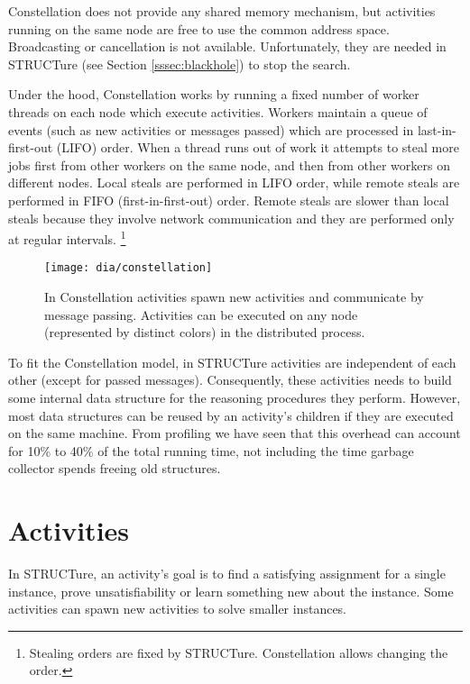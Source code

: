 Constellation does not provide any shared memory mechanism,
but activities running on the same node are free to use the
common address space. Broadcasting or cancellation is not
available. Unfortunately, they are needed in STRUCTure (see
Section \ref{sssec:blackhole}) to stop the search.

Under the hood, Constellation works by running a fixed number of
worker threads on each node which execute activities.  Workers
maintain a queue of events (such as new activities or messages
passed) which are processed in last-in-first-out (LIFO) order.
When a thread runs out of work it attempts to steal more jobs first
from other workers on the same node, and then from other workers
on different nodes.  Local steals are performed in LIFO order,
while remote steals are performed in FIFO (first-in-first-out)
order. Remote steals are slower than local steals because they
involve network communication and they are performed only at
regular intervals. \footnote{Stealing orders are fixed by STRUCTure.
Constellation allows changing the order.}

\begin{figure}
  \centering
  \texttt{[image: dia/constellation]}
  \caption{In Constellation activities spawn new
  activities and communicate by message passing.
  Activities can be executed on any node (represented by
  distinct colors) in the distributed process.}
  \label{fig:constellation}
\end{figure}


To fit the Constellation model, in STRUCTure activities are
independent of each other (except for passed messages). Consequently,
these activities needs to build some internal data structure for
the reasoning procedures they perform. However, most data structures
can be reused by an activity's children if they are executed on the
same machine. From profiling we have seen that this overhead can
account for 10\% to 40\% of the total running time, not including
the time garbage collector spends freeing old structures.

\section{Activities}

In STRUCTure, an activity's goal is to find a satisfying assignment
for a single instance, prove unsatisfiability or learn something new
about the instance. Some activities can spawn new activities to
solve smaller instances.

